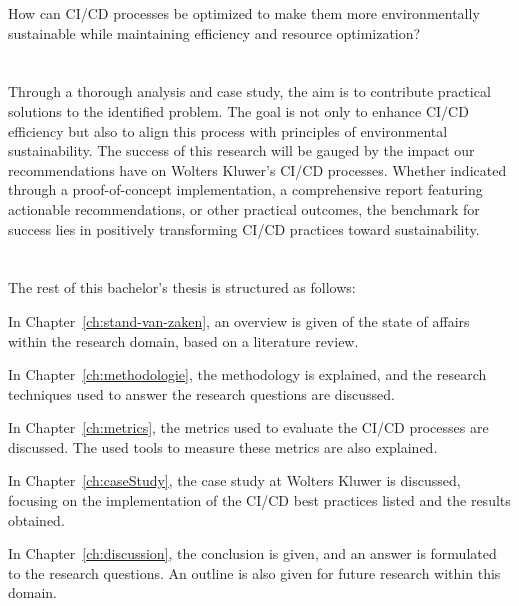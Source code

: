 How can CI/CD processes be optimized to make them more environmentally sustainable while maintaining efficiency
and resource optimization?


\section{}%
\label{sec:onderzoeksdoelstelling}

Through a thorough analysis and case study, the aim is to contribute practical solutions to the identified problem.
The goal is not only to enhance CI/CD efficiency but also to align this process with principles of environmental sustainability.
The success of this research will be gauged by the impact our recommendations have on Wolters Kluwer's CI/CD processes. 
Whether indicated through a proof-of-concept implementation, a comprehensive report featuring actionable recommendations, or other practical outcomes, the benchmark for success lies in positively transforming CI/CD practices toward sustainability.


\section{}%
\label{sec:opzet-bachelorproef}


The rest of this bachelor's thesis is structured as follows:

In Chapter~\ref{ch:stand-van-zaken}, an overview is given of the state of affairs within the research domain, based on a literature review.

In Chapter~\ref{ch:methodologie}, the methodology is explained, and the research techniques used to answer the research questions are discussed.

In Chapter~\ref{ch:metrics}, the metrics used to evaluate the CI/CD processes are discussed. The used tools to measure these metrics are also explained.

In Chapter~\ref{ch:caseStudy}, the case study at Wolters Kluwer is discussed, focusing on the implementation of the CI/CD best practices listed and the results obtained.

In Chapter~\ref{ch:discussion}, the conclusion is given, and an answer is formulated to the research questions. An outline is also given for future research within this domain.